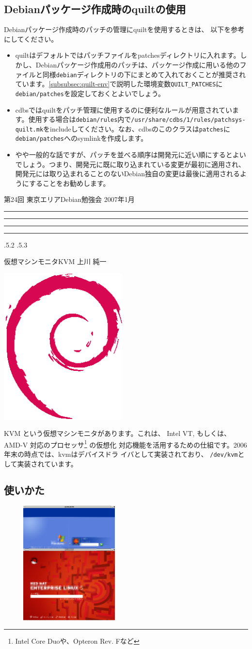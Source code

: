 \documentclass[mingoth,a4paper,twoside]{jsarticle}
\makeatletter
\newcommand{\debmtgyear}{2007}
\newcommand{\debmtgmonth}{1}
\newcommand{\debmtgnumber}{24}
\renewcommand{\section}{\@startsection{section}{1}{\z@}%
    {\Cvs \@plus.5\Cdp \@minus.2\Cdp}%
    {.5\Cvs \@plus.3\Cdp}%
    {\normalfont\gt\fontsize{32}{32}\headfont\raggedright}} %
\newcommand{\dancersection}[2]{%
\newpage
第\debmtgnumber{}回 東京エリアDebian勉強会 \debmtgyear{}年\debmtgmonth{}月
\hrule
\vspace{0.5mm}
\hrule
%
\vspace{4cm}
\hrule
\vspace{0.5mm}
\hrule
%
\vspace{-7cm}
\begin{minipage}[b]{0.7\hsize}
\section{#1}
\hfill{}#2\\
\vspace{2cm}
\end{minipage}
\begin{minipage}[b]{0.3\hsize}
\hfill{}\includegraphics[height=8cm]{image200502/openlogo-nd.eps}\\
\end{minipage}
%
\vspace{-1cm}
}
\makeatother
\begin{document}
\subsection{Debianパッケージ作成時のquiltの使用}
\label{subsec:quilt-Debian-packaging}

Debianパッケージ作成時のパッチの管理にquiltを使用するときは、
以下を参考にしてください。

\begin{itemize}
 \item quiltはデフォルトではパッチファイルをpatchesディレクトリに入れます。しかし、Debianパッケージ作成用のパッチは、パッケージ作成に用いる他のファイルと同様\texttt{debian}ディレクトリの下にまとめて入れておくことが推奨されています。\ref{subsubsec:quilt-env}で説明した環境変数\texttt{QUILT\_PATCHES}に\texttt{debian/patches}を設定しておくとよいでしょう。
 \item cdbsではquiltをパッチ管理に使用するのに便利なルールが用意されています。使用する場合は\texttt{debian/rules}内で\texttt{/usr/share/cdbs/1/rules/patchsys-quilt.mk}をincludeしてください。なお、cdbsのこのクラスは\texttt{patches}に\texttt{debian/patches}へのsymlinkを作成します。
 \item やや一般的な話ですが、パッチを並べる順序は開発元に近い順にするとよいでしょう。つまり、開発元に既に取り込まれている変更が最初に適用され、開発元には取り込まれることのないDebian独自の変更は最後に適用されるようにすることをお勧めします。
\end{itemize}


\dancersection{仮想マシンモニタKVM}{上川 純一}
\label{sec:kvm}

KVM という仮想マシンモニタがあります。これは、 Intel VT, もしくは、AMD-V 
対応のプロセッサ\footnote{Intel Core Duoや、Opteron Rev. Fなど} の仮想化
対応機能を活用するための仕組です。2006年末の時点では、kvmはデバイスドラ
イバとして実装されており、 \texttt{/dev/kvm}として実装されています。


\subsection{使いかた}

\begin{figure}\includegraphics[width=5cm]{image200701/kvm.png}\end{figure}
\end{document}
